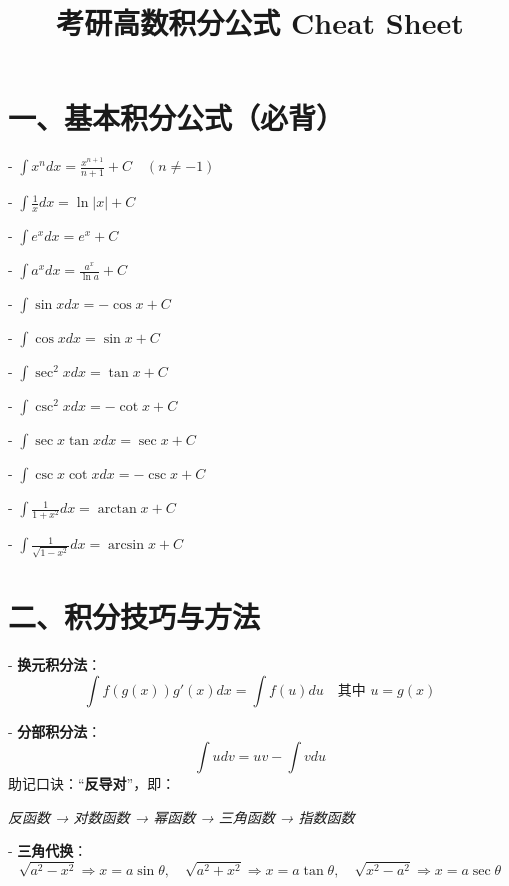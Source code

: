 \documentclass[UTF8]{ctexart}
\title{考研高数积分公式 Cheat Sheet}
\author{}
\date{}
\begin{document}
	
	\maketitle
	
	\section*{一、基本积分公式（必背）}
	\begin{multicols}{2}
		
		
		- $\displaystyle \int x^n dx = \frac{x^{n+1}}{n+1} + C \quad (n \neq -1)$
		
		- $\displaystyle \int \frac{1}{x} dx = \ln|x| + C$
		
		- $\displaystyle \int e^x dx = e^x + C$
		
		- $\displaystyle \int a^x dx = \frac{a^x}{\ln a} + C$
		
		- $\displaystyle \int \sin x dx = -\cos x + C$
		
		- $\displaystyle \int \cos x dx = \sin x + C$
		
		- $\displaystyle \int \sec^2 x dx = \tan x + C$
		
		- $\displaystyle \int \csc^2 x dx = -\cot x + C$
		
		- $\displaystyle \int \sec x \tan x dx = \sec x + C$
		
		- $\displaystyle \int \csc x \cot x dx = -\csc x + C$
		
		- $\displaystyle \int \frac{1}{1+x^2} dx = \arctan x + C$
		
		- $\displaystyle \int \frac{1}{\sqrt{1-x^2}} dx = \arcsin x + C$
		
	\end{multicols}
	
	\section*{二、积分技巧与方法}
	
	
	- \textbf{换元积分法}：
	$$
	\int f(g(x))g'(x)dx = \int f(u)du \quad \text{其中 } u = g(x)
	$$
	
	- \textbf{分部积分法}：
	$$
	\int u dv = uv - \int v du
	$$
	助记口诀：“\textbf{反导对}”，即：
	\begin{center}
		\textit{反函数 → 对数函数 → 幂函数 → 三角函数 → 指数函数}
	\end{center}
	
	- \textbf{三角代换}：
	$$
	\sqrt{a^2 - x^2} \Rightarrow x = a\sin\theta,\quad
	\sqrt{a^2 + x^2} \Rightarrow x = a\tan\theta,\quad
	\sqrt{x^2 - a^2} \Rightarrow x = a\sec\theta
	$$
	
\end{document}
